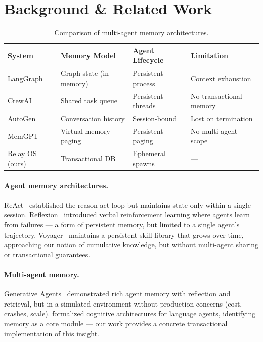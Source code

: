 \documentclass{article}
\begin{document}
\section{Background \& Related Work}

\begin{table}[h]
\centering
\caption{Comparison of multi-agent memory architectures.}
\begin{tabular}{@{}llll@{}}
\toprule
\textbf{System} & \textbf{Memory Model} & \textbf{Agent Lifecycle} & \textbf{Limitation} \\
\midrule
LangGraph~\citep{langgraph2024} & Graph state (in-memory) & Persistent process & Context exhaustion \\
CrewAI~\citep{crewai2024} & Shared task queue & Persistent threads & No transactional memory \\
AutoGen~\citep{wu2023autogen} & Conversation history & Session-bound & Lost on termination \\
MemGPT~\citep{packer2023memgpt} & Virtual memory paging & Persistent + paging & No multi-agent scope \\
Relay OS (ours) & Transactional DB & Ephemeral spawns & --- \\
\bottomrule
\end{tabular}
\label{tab:related}
\end{table}

\paragraph{Agent memory architectures.} ReAct~\citep{yao2023react} established the reason-act loop but maintains state only within a single session. Reflexion~\citep{shinn2023reflexion} introduced verbal reinforcement learning where agents learn from failures --- a form of persistent memory, but limited to a single agent's trajectory. Voyager~\citep{wang2023voyager} maintains a persistent skill library that grows over time, approaching our notion of cumulative knowledge, but without multi-agent sharing or transactional guarantees.

\paragraph{Multi-agent memory.} Generative Agents~\citep{park2023generative} demonstrated rich agent memory with reflection and retrieval, but in a simulated environment without production concerns (cost, crashes, scale). \citet{sumers2024cognitive} formalized cognitive architectures for language agents, identifying memory as a core module --- our work provides a concrete transactional implementation of this insight.
\end{document}
